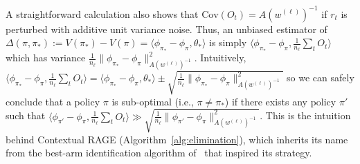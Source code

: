 \documentclass{article}
\newcommand{\1}{\mathbf{1}}
\begin{document}
A straightforward calculation also shows that $\text{Cov}( O_t ) = A(w^{(\ell)})^{-1}$ if $r_t$ is perturbed with additive unit variance noise.
Thus, an unbiased estimator of $\Delta(\pi, \pi_{\ast}):= V(\pi_*)-V(\pi) = \langle \phi_{\pi_*} - \phi_\pi, \theta_* \rangle$ is simply $\langle \phi_{\pi_*} - \phi_{\pi}, \frac{1}{n_{\ell}} \sum_t O_t \rangle$ which has variance $\frac{1}{n_{\ell}} \| \phi_{\pi_*} - \phi_{\pi} \|_{A(w^{(\ell)})^{-1}}^2$.
Intuitively,  $\langle \phi_{\pi_*} - \phi_{\pi}, \frac{1}{n_{\ell}} \sum_t O_t \rangle = \langle \phi_{\pi_*} - \phi_\pi, \theta_* \rangle \pm \sqrt{\frac{1}{n_{\ell}} \| \phi_{\pi_*} - \phi_{\pi} \|_{A(w^{(\ell)})^{-1}}^2}$ so we can safely conclude that a policy $\pi$ is sub-optimal (i.e., $\pi \neq \pi_*$) if there exists any policy $\pi'$ such that $\langle \phi_{\pi'} - \phi_{\pi}, \frac{1}{n_{\ell}} \sum_t O_t \rangle \gg \sqrt{\frac{1}{n_{\ell}} \| \phi_{\pi'} - \phi_{\pi} \|_{A(w^{(\ell)})^{-1}}^2}$.
This is the intuition behind Contextual RAGE (Algorithm~\ref{alg:elimination}), which inherits its name from the best-arm identification algorithm of~\cite{fiez2019sequential} that inspired its strategy.
\end{document}
